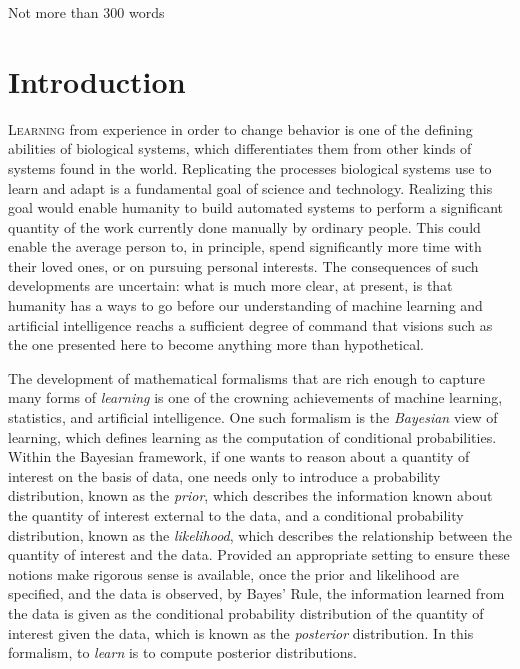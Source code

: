 \documentclass[11pt]{book}
\begin{document}
Not more than 300 words

\tableofcontents





\chapter{Introduction}

\lettrine{L}{earning} from experience in order to change behavior is one of the defining abilities of biological systems, which differentiates them from other kinds of systems found in the world.
Replicating the processes biological systems use to learn and adapt is a fundamental goal of science and technology.
Realizing this goal would enable humanity to build automated systems to perform a significant quantity of the work currently done manually by ordinary people.
This could enable the average person to, in principle, spend significantly more time with their loved ones, or on pursuing personal interests.
The consequences of such developments are uncertain: what is much more clear, at present, is that humanity has a ways to go before our understanding of machine learning and artificial intelligence reachs a sufficient degree of command that visions such as the one presented here to become anything more than hypothetical.

The development of mathematical formalisms that are rich enough to capture many forms of \emph{learning} is one of the crowning achievements of machine learning, statistics, and artificial intelligence.
One such formalism is the \emph{Bayesian} view of learning, which defines learning as the computation of conditional probabilities.
Within the Bayesian framework, if one wants to reason about a quantity of interest on the basis of data, one needs only to introduce a probability distribution, known as the \emph{prior}, which describes the information known about the quantity of interest external to the data, and a conditional probability distribution, known as the \emph{likelihood}, which describes the relationship between the quantity of interest and the data.
Provided an appropriate setting to ensure these notions make rigorous sense is available, once the prior and likelihood are specified, and the data is observed, by Bayes' Rule, the information learned from the data is given as the conditional probability distribution of the quantity of interest given the data, which is known as the \emph{posterior} distribution.
In this formalism, to \emph{learn} is to compute posterior distributions.
\end{document}
